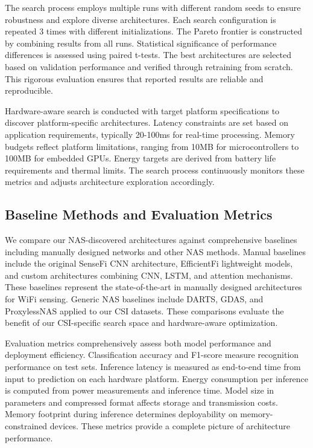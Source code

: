\documentclass[journal]{IEEEtran}
\begin{document}
The search process employs multiple runs with different random seeds to ensure robustness and explore diverse architectures. Each search configuration is repeated 3 times with different initializations. The Pareto frontier is constructed by combining results from all runs. Statistical significance of performance differences is assessed using paired t-tests. The best architectures are selected based on validation performance and verified through retraining from scratch. This rigorous evaluation ensures that reported results are reliable and reproducible.

Hardware-aware search is conducted with target platform specifications to discover platform-specific architectures. Latency constraints are set based on application requirements, typically 20-100ms for real-time processing. Memory budgets reflect platform limitations, ranging from 10MB for microcontrollers to 100MB for embedded GPUs. Energy targets are derived from battery life requirements and thermal limits. The search process continuously monitors these metrics and adjusts architecture exploration accordingly.

\subsection{Baseline Methods and Evaluation Metrics}

We compare our NAS-discovered architectures against comprehensive baselines including manually designed networks and other NAS methods. Manual baselines include the original SenseFi CNN architecture, EfficientFi lightweight models, and custom architectures combining CNN, LSTM, and attention mechanisms. These baselines represent the state-of-the-art in manually designed architectures for WiFi sensing. Generic NAS baselines include DARTS, GDAS, and ProxylessNAS applied to our CSI datasets. These comparisons evaluate the benefit of our CSI-specific search space and hardware-aware optimization.

Evaluation metrics comprehensively assess both model performance and deployment efficiency. Classification accuracy and F1-score measure recognition performance on test sets. Inference latency is measured as end-to-end time from input to prediction on each hardware platform. Energy consumption per inference is computed from power measurements and inference time. Model size in parameters and compressed format affects storage and transmission costs. Memory footprint during inference determines deployability on memory-constrained devices. These metrics provide a complete picture of architecture performance.
\end{document}
